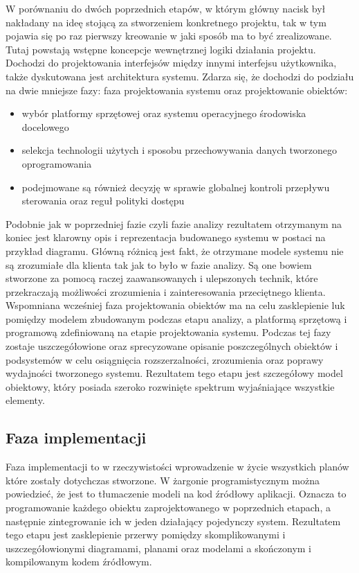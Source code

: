\documentclass[oneside,polski,logo]{amuthesis}
\begin{document}
W porównaniu do dwóch poprzednich etapów, w którym główny nacisk był nakładany na ideę stojącą za stworzeniem konkretnego projektu, tak w tym pojawia się po raz pierwszy kreowanie w jaki sposób ma to być zrealizowane. Tutaj powstają wstępne koncepcje wewnętrznej logiki działania projektu. Dochodzi do projektowania interfejsów między innymi interfejsu użytkownika, także dyskutowana jest architektura systemu. Zdarza się, że dochodzi do podziału na dwie mniejsze fazy: faza projektowania systemu oraz projektowanie obiektów:\\
\begin{itemize}
	\item  wybór platformy sprzętowej oraz systemu operacyjnego środowiska docelowego 
	\item selekcja technologii użytych i sposobu przechowywania danych tworzonego oprogramowania 
	\item podejmowane są również decyzję w sprawie globalnej kontroli przepływu sterowania oraz reguł polityki dostępu \\
\end{itemize}
Podobnie jak w poprzedniej fazie czyli fazie analizy rezultatem otrzymanym na koniec jest klarowny opis i reprezentacja budowanego systemu w postaci na przykład diagramu. Główną różnicą jest fakt, że otrzymane modele systemu nie są zrozumiałe dla klienta tak jak to było w fazie analizy. Są one bowiem stworzone za pomocą raczej zaawansowanych i ulepszonych technik, które przekraczają możliwości zrozumienia i zainteresowania przeciętnego klienta.\\

Wspomniana wcześniej faza projektowania obiektów ma na celu zasklepienie luk pomiędzy modelem zbudowanym podczas etapu analizy, a platformą sprzętową i programową zdefiniowaną na etapie projektowania systemu. Podczas tej fazy zostaje uszczegółowione oraz sprecyzowane opisanie poszczególnych obiektów i podsystemów w celu osiągnięcia rozszerzalności, zrozumienia oraz poprawy wydajności tworzonego systemu. Rezultatem tego etapu jest szczegółowy model obiektowy, który posiada szeroko rozwinięte spektrum wyjaśniające wszystkie elementy.\\

\subsection {Faza implementacji}
Faza implementacji to w rzeczywistości wprowadzenie w życie wszystkich planów które zostały dotychczas stworzone. W żargonie programistycznym można powiedzieć, że jest to tłumaczenie modeli na kod źródłowy aplikacji. Oznacza to programowanie każdego obiektu zaprojektowanego w poprzednich etapach, a następnie zintegrowanie ich w jeden działający pojedynczy system. Rezultatem tego etapu jest zasklepienie przerwy pomiędzy skomplikowanymi i uszczegółowionymi diagramami, planami oraz modelami a skończonym i kompilowanym kodem źródłowym.\\
\end{document}

